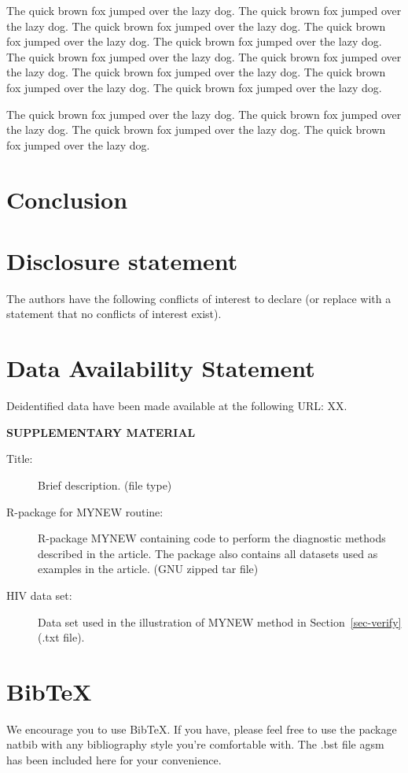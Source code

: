 \documentclass[
  12pt]{article}
\begin{document}
The quick brown fox jumped over the lazy dog. The quick brown fox jumped
over the lazy dog. The quick brown fox jumped over the lazy dog. The
quick brown fox jumped over the lazy dog. The quick brown fox jumped
over the lazy dog. The quick brown fox jumped over the lazy dog. The
quick brown fox jumped over the lazy dog. The quick brown fox jumped
over the lazy dog. The quick brown fox jumped over the lazy dog. The
quick brown fox jumped over the lazy dog.

The quick brown fox jumped over the lazy dog. The quick brown fox jumped
over the lazy dog. The quick brown fox jumped over the lazy dog. The
quick brown fox jumped over the lazy dog.

\addtolength{\textheight}{-.2in}%

\section{Conclusion}\label{sec-conc}

\section{Disclosure statement}\label{disclosure-statement}

The authors have the following conflicts of interest to declare (or
replace with a statement that no conflicts of interest exist).

\section{Data Availability Statement}\label{data-availability-statement}

Deidentified data have been made available at the following URL: XX.

\label{supplementary-material}
\bigskip

\begin{center}

{\large\bf SUPPLEMENTARY MATERIAL}

\end{center}

\begin{description}
\item[Title:]
Brief description. (file type)
\item[R-package for MYNEW routine:]
R-package MYNEW containing code to perform the diagnostic methods
described in the article. The package also contains all datasets used as
examples in the article. (GNU zipped tar file)
\item[HIV data set:]
Data set used in the illustration of MYNEW method in
Section~\ref{sec-verify} (.txt file).
\end{description}

\section{BibTeX}\label{bibtex}

We encourage you to use BibTeX. If you have, please feel free to use the
package natbib with any bibliography style you're comfortable with. The
.bst file agsm has been included here for your convenience.


  
\end{document}
